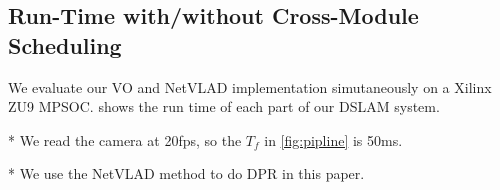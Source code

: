 

\subsection{Run-Time with/without Cross-Module Scheduling}

We evaluate our VO and NetVLAD implementation simutaneously on a Xilinx ZU9 MPSOC.  shows the run time of each part of our DSLAM system.



\begin{table}[h]
    \centering
    \caption{Run time of each part in our DSLAM}
    \footnotesize
    \begin{threeparttable}
  \begin{tablenotes}
        \item[*] We read the camera at 20fps, so the $T_{f}$ in \cref{fig:pipline} is 50ms.
        \item[*] We use the NetVLAD method to do DPR in this paper.
        \end{tablenotes}
      \end{threeparttable}
    \label{tab:time}%
    
  \end{table}%


